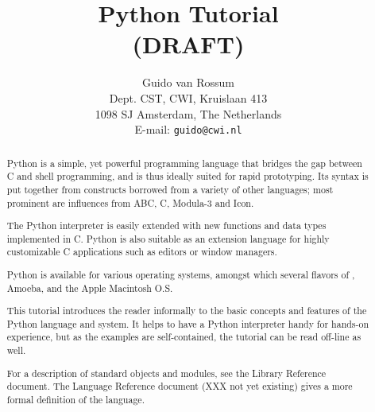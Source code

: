 

\title{\bf
	Python Tutorial \\
	(DRAFT)
}

\author{
	Guido van Rossum \\
	Dept. CST, CWI, Kruislaan 413 \\
	1098 SJ Amsterdam, The Netherlands \\
	E-mail: {\tt guido@cwi.nl}
}




\maketitle

\begin{abstract}

\noindent
Python is a simple, yet powerful programming language that bridges the
gap between C and shell programming, and is thus ideally suited for rapid
prototyping.
Its syntax is put together from constructs borrowed from a variety of other
languages; most prominent are influences from ABC, C, Modula-3 and Icon.

The Python interpreter is easily extended with new functions and data
types implemented in C.
Python is also suitable as an extension language for highly
customizable C applications such as editors or window managers.

Python is available for various operating systems, amongst which
several flavors of \UNIX, Amoeba, and the Apple Macintosh O.S.

This tutorial introduces the reader informally to the basic concepts and
features of the Python language and system.
It helps to have a Python interpreter handy for hands-on experience,
but as the examples are self-contained, the tutorial can be read
off-line as well.

For a description of standard objects and modules, see the Library
Reference document.
The Language Reference document (XXX not yet existing)
gives a more formal definition of the language.

\end{abstract}

\pagebreak

\tableofcontents

\pagebreak

